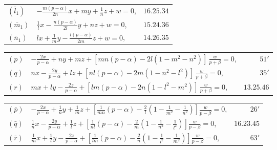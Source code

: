 \documentclass[11pt,a4paper]{book}
\begin{document}
\begin{center}
\begin{tabular}{@{}l@{\qquad}l@{\qquad}r@{}}
$(\bar{l}_1)$ & $\displaystyle -\frac{m(p - \alpha)}{2n}x + my + \frac{1}{n}z + w = 0$, & $16.25.34$ \\[4pt]
$(\bar{m}_1)$ & $\displaystyle \frac{1}{l}x - \frac{n(p - \alpha)}{2l}y + nz + w = 0$, & $15.24.36$ \\[4pt]
$(\bar{n}_1)$ & $\displaystyle lx + \frac{1}{m}y - \frac{l(p - \alpha)}{2m}z + w = 0$, & $14.26.35$
\end{tabular}
\end{center}

\begin{center}
\begin{tabular}{@{}l@{\qquad}l@{\qquad}r@{}}
$(p)$ & $\displaystyle -\frac{2x}{p - \alpha} + ny + mz + [mn(p - \alpha) - 2l(1 - m^2 - n^2)]\,\frac{w}{p + \beta} = 0$, & $51'$ \\[4pt]
$(q)$ & $\displaystyle nx - \frac{2y}{p - \alpha} + lz + [nl(p - \alpha) - 2m(1 - n^2 - l^2)]\,\frac{w}{p + \beta} = 0$, & $35'$ \\[4pt]
$(r)$ & $\displaystyle mx + ly - \frac{2z}{p - \alpha} + [lm(p - \alpha) - 2n(1 - l^2 - m^2)]\,\frac{w}{p + \beta} = 0$, & $13.25.46$
\end{tabular}
\end{center}

\begin{center}
\begin{tabular}{@{}l@{\qquad}l@{\qquad}r@{}}
$(\bar{p})$ & $\displaystyle -\frac{2x}{p - \alpha} + \frac{1}{n}y + \frac{1}{m}z + \left[\frac{1}{mn}(p - \alpha) - \frac{2}{l}\left(1 - \frac{1}{m^2} - \frac{1}{n^2}\right)\right]\frac{w}{p - \beta} = 0$, & $26'$ \\[4pt]
$(\bar{q})$ & $\displaystyle \frac{1}{n}x - \frac{2y}{p - \alpha} + \frac{1}{l}z + \left[\frac{1}{nl}(p - \alpha) - \frac{2}{m}\left(1 - \frac{1}{n^2} - \frac{1}{l^2}\right)\right]\frac{w}{p - \beta} = 0$, & $16.23.45$ \\[4pt]
$(\bar{r})$ & $\displaystyle \frac{1}{m}x + \frac{1}{l}y - \frac{2z}{p - \alpha} + \left[\frac{1}{lm}(p - \alpha) - \frac{2}{n}\left(1 - \frac{1}{l^2} - \frac{1}{m^2}\right)\right]\frac{w}{p - \beta} = 0$, & $63'$
\end{tabular}
\end{center}
\end{document}
